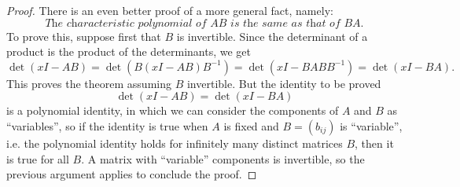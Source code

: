 {{\begin{Solution}
\begin{proof}
            There is an even better proof of a more general fact, namely: 
            \begin{equation*}
                \textit{The characteristic polynomial of $AB$ is the same as that of $BA$.} 
            \end{equation*}
            To prove this, suppose first that $B$ is invertible. 
            Since the determinant of a product is the product of the determinants, we get 
            \begin{equation*}
                \det(xI - AB) = \det(B(xI - AB)B^{-1}) = \det(xI - BABB^{-1}) = \det (xI - BA). 
            \end{equation*}
            This proves the theorem assuming $B$ invertible. 
            But the identity to be proved 
            \begin{equation*}
                \det(xI - AB) = \det(xI - BA) 
            \end{equation*}
            is a polynomial identity, in which we can consider the components of $A$ and $B$ as ``variables'', so if the identity is true when $A$ is fixed and $B = (b_{ij})$ is ``variable'', i.e. the polynomial identity holds for infinitely many distinct matrices $B$, then it is true for all $B$. 
            A matrix with ``variable'' components is invertible, so the previous argument applies to conclude the proof. 
        \end{proof}
    \end{Solution}
}
}